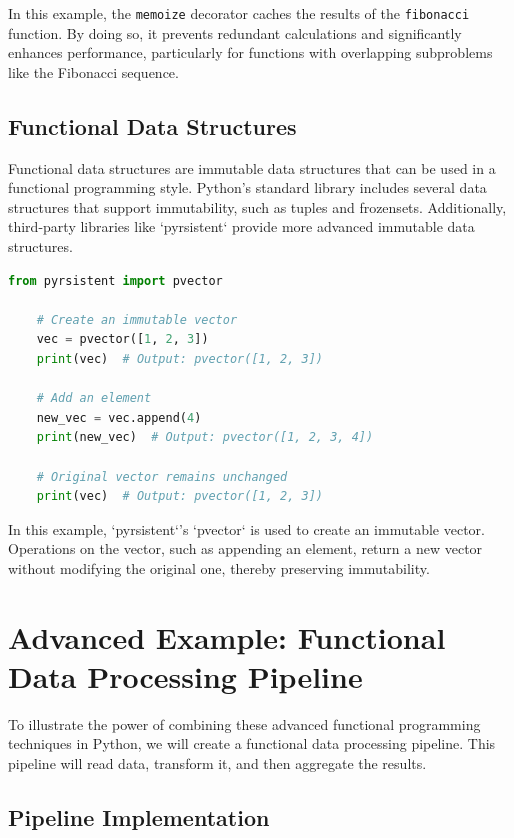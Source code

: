 \documentclass[a4paper]{article}
\begin{document}
In this example, the \texttt{memoize} decorator caches the results of the \texttt{fibonacci} function. By doing so, it prevents redundant calculations and significantly enhances performance, particularly for functions with overlapping subproblems like the Fibonacci sequence.

\subsection{Functional Data Structures}
Functional data structures are immutable data structures that can be used in a functional programming style. Python's standard library includes several data structures that support immutability, such as tuples and frozensets. Additionally, third-party libraries like `pyrsistent` provide more advanced immutable data structures.

\begin{lstlisting}[language=Python, caption=Functional Data Structures Example]
    from pyrsistent import pvector

    # Create an immutable vector
    vec = pvector([1, 2, 3])
    print(vec)  # Output: pvector([1, 2, 3])

    # Add an element
    new_vec = vec.append(4)
    print(new_vec)  # Output: pvector([1, 2, 3, 4])

    # Original vector remains unchanged
    print(vec)  # Output: pvector([1, 2, 3])
\end{lstlisting}

In this example, `pyrsistent`'s `pvector` is used to create an immutable vector. Operations on the vector, such as appending an element, return a new vector without modifying the original one, thereby preserving immutability.

\section{Advanced Example: Functional Data Processing Pipeline}
To illustrate the power of combining these advanced functional programming techniques in Python, we will create a functional data processing pipeline. This pipeline will read data, transform it, and then aggregate the results. 

\subsection{Pipeline Implementation}
\end{document}

